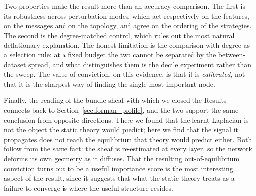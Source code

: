 Two properties make the result more than an accuracy comparison. The first is its
robustness across perturbation modes, which act respectively on the features, on
the messages and on the topology, and agree on the ordering of the strategies.
The second is the degree-matched control, which rules out the most natural
deflationary explanation. The honest limitation is the comparison with degree as
a selection rule: at a fixed budget the two cannot be separated by the
between-dataset spread, and what distinguishes them is the decile experiment
rather than the sweep. The value of conviction, on this evidence, is that it is
\emph{calibrated}, not that it is the sharpest way of finding the single most
important node.

Finally, the reading of the bundle sheaf with which we closed the Results
connects back to Section~\ref{sec:forman_profile}, and the two support the same
conclusion from opposite directions. There we found that the learnt Laplacian is
not the object the static theory would predict; here we find that the signal it
propagates does not reach the equilibrium that theory would predict either. Both
follow from the same fact: the sheaf is re-estimated at every layer, so the
network deforms its own geometry as it diffuses. That the resulting
out-of-equilibrium conviction turns out to be a useful importance score is the
most interesting aspect of the result, since it suggests that what the static
theory treats as a failure to converge is where the useful structure resides.
